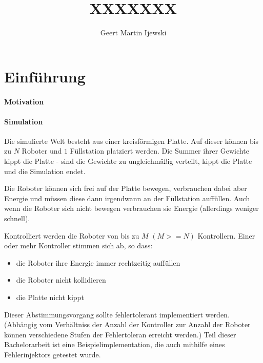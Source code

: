 \documentclass[
    12pt,
    bibliography=totoc,
    ngerman
]{scrartcl}
\title{XXXXXXX}
\author{Geert Martin Ijewski}
\begin{document}
\maketitle
\thispagestyle{empty}

\clearpage
\tableofcontents
\listoffigures
\listoftables

\clearpage
\section{Einf{\"{u}}hrung}

\paragraph{Motivation} 

\paragraph{Simulation} Die simulierte Welt besteht aus einer kreisf{\"{o}}rmigen Platte. Auf dieser k{\"{o}}nnen bis zu $N$ Roboter und $1$ F{\"{u}}llstation
platziert werden. Die Summer ihrer Gewichte kippt die Platte - sind die Gewichte zu ungleichm{\"{a}}{\ss}ig verteilt, kippt
die Platte und die Simulation endet.

Die Roboter k{\"{o}}nnen sich frei auf der Platte bewegen, verbrauchen dabei aber Energie und m{\"{u}}ssen diese dann irgendwann
an der F{\"{u}}llstation auff{\"{u}}llen. Auch wenn die Roboter sich nicht bewegen verbrauchen sie Energie (allerdings weniger
schnell).

Kontrolliert werden die Roboter von bis zu $M$ $(M >= N)$ Kontrollern. Einer oder mehr Kontroller stimmen sich ab,
so dass:
\begin{itemize}
\item die Roboter ihre Energie immer rechtzeitig auff{\"{u}}llen
\item die Roboter nicht kollidieren
\item die Platte nicht kippt
\end{itemize}

Dieser Abstimmungsvorgang sollte fehlertolerant implementiert werden. (Abh{\"{a}}ngig vom Verh{\"{a}}ltniss der Anzahl der Kontroller zur
Anzahl der Roboter k{\"{o}}nnen verschiedene Stufen der Fehlertoleran erreicht werden.\cite[s.149]{Werner00}) Teil dieser Bachelorarbeit ist eine
Beispielimplementation, die auch mithilfe eines Fehlerinjektors getestet wurde.
\end{document}
